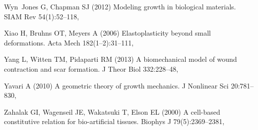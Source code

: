 \begin{thebibliography}{124}
Wyn~Jones G, Chapman SJ (2012) Modeling growth in biological materials. SIAM
  Rev 54(1):52--118, 

Xiao H, Bruhns OT, Meyers A (2006) Elastoplasticity beyond small deformations.
  Acta Mech 182(1--2):31--111, 

Yang L, Witten TM, Pidaparti RM (2013) A biomechanical model of wound
  contraction and scar formation. J Theor Biol 332:228--48,

Yavari A (2010) A geometric theory of growth mechanics. J Nonlinear Sci
  20:781--830, 

Zahalak GI, Wagenseil JE, Wakatsuki T, Elson EL (2000) A cell-based
  constitutive relation for bio-artificial tissues. Biophys J 79(5):2369--2381,

\end{thebibliography}



